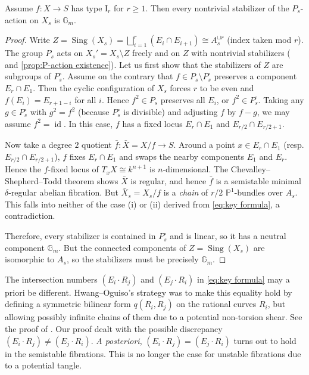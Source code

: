 \documentclass[reqno, letterpaper]{amsart}
\numberwithin{equation}{subsection}
\let\to\longrightarrow
\newcommand{\GG}{\mathbb{G}}
\newcommand{\PP}{\mathbb{P}}
\DeclareMathOperator{\id}{id}
\DeclareMathOperator{\Sing}{Sing}
\begin{document}
		\begin{lemma} \label{lem:stabilizer of Ir}
			Assume $f : X \to S$ has type $\mathrm I_r$ for $r \ge 1$. Then every nontrivial stabilizer of the $P_s$-action on $X_s$ is $\GG_m$.
		\end{lemma}
		\begin{proof}
			Write $Z = \Sing(X_s) = \bigsqcup_{i=1}^r (E_i \cap E_{i+1}) \cong A_s^{\sqcup r}$ (index taken mod $r$). The group $P_s$ acts on $X_s' = X_s \setminus Z$ freely and on $Z$ with nontrivial stabilizers ( and \ref{prop:P-action existence}). Let us first show that the stabilizers of $Z$ are subgroups of $P_s^\circ$. Assume on the contrary that $f \in P_s \setminus P_s^\circ$ preserves a component $E_r \cap E_1$. Then the cyclic configuration of $X_s$ forces $r$ to be even and $f(E_i) = E_{r+1-i}$ for all $i$. Hence $f^2 \in P_s$ preserves all $E_i$, or $f^2 \in P_s^\circ$. Taking any $g \in P_s^\circ$ with $g^2 = f^2$ (because $P_s^\circ$ is divisible) and adjusting $f$ by $f - g$, we may assume $f^2 = \id$. In this case, $f$ has a fixed locus $E_r \cap E_1$ and $E_{r/2} \cap E_{r/2+1}$.
			
			Now take a degree $2$ quotient $\bar f : \bar X = X / f \to S$. Around a point $x \in E_r \cap E_1$ (resp. $E_{r/2} \cap E_{r/2+1}$), $f$ fixes $E_r \cap E_1$ and swaps the nearby components $E_1$ and $E_r$. Hence the $f$-fixed locus of $T_x X \cong k^{n+1}$ is $n$-dimensional. The Chevalley--Shepherd--Todd theorem shows $\bar X$ is regular, and hence $\bar f$ is a semistable minimal $\delta$-regular abelian fibration. But $\bar X_s = X_s / f$ is a \emph{chain} of $r/2$ $\PP^1$-bundles over $A_s$. This falls into neither of the case (i) or (ii) derived from \eqref{eq:key formula}, a contradiction.
			
			Therefore, every stabilizer is contained in $P_s^\circ$ and is linear, so it has a neutral component $\GG_m$. But the connected components of $Z = \Sing(X_s)$ are isomorphic to $A_s$, so the stabilizers must be precisely $\GG_m$.
		\end{proof}
		
		\begin{remark} \label{rmk:intersection number}
			The intersection numbers $(E_i \cdot R_j)$ and $(E_j \cdot R_i)$ in \eqref{eq:key formula} may a priori be different. Hwang--Oguiso's strategy was to make this equality hold by defining a symmetric bilinear form $q(R_i, R_j)$ on the rational curves $R_i$, but allowing possibly infinite chains of them due to a potential non-torsion shear. See the proof of \cite[Proposition~4.10]{hwang-ogu09}. Our proof dealt with the possible discrepancy $(E_i \cdot R_j) \neq (E_j \cdot R_i)$. \emph{A posteriori}, $(E_i \cdot R_j) = (E_j \cdot R_i)$ turns out to hold in the semistable fibrations. This is no longer the case for unstable fibrations due to a potential tangle.
		\end{remark}
		
\end{document}
